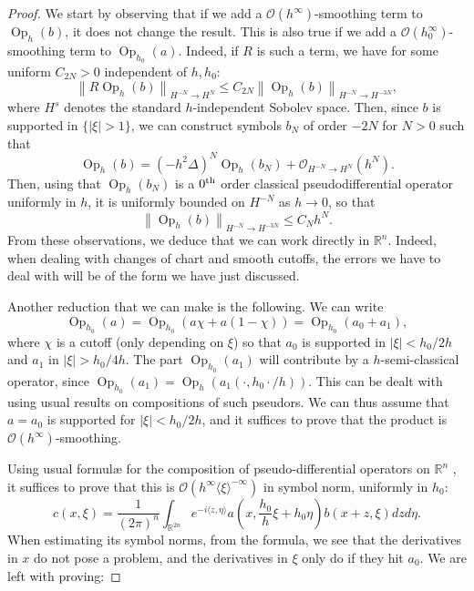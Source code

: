 \documentclass[10pt]{amsart}
\theoremstyle{definition}\newtheorem{defi}[theo]{Definition}\newtheorem{rema}[theo]{Remark}\newtheorem{exam}[theo]{Example}\newtheorem{exem}[theo]{Example}\newtheorem{nota}[theo]{Notation}
\newcommand{\R}{\mathbb{R}}
\newcommand{\mc}{\mathcal}
\newcommand{\clO}{\mathcal{O}}
\DeclareMathOperator{\Op}{Op}
\begin{document}
\begin{proof}
We start by observing that if we add a $\clO(h^\infty)$-smoothing term to $\Op_h(b)$, it does not change the result. This is also true if we add a $\clO(h_0^\infty)$-smoothing term to $\Op_{h_0}(a)$. Indeed, if $R$ is such a term, we have for some uniform $C_{2N} > 0$ independent of $h,h_0$:
\[
\left\| R \Op_h(b)\right\|_{H^{-N}\to H^N} \leq C_{2N} \left\| \Op_h(b)\right\|_{H^{-N}\to H^{-3N}},
\]
where $H^s$ denotes the standard $h$-independent Sobolev space. Then, since $b$ is supported in $\{ |\xi|> 1 \}$, we can construct symbols $b_N$ of order $-2N$ for $N>0$ such that
\[
\Op_h(b) = \left(-h^2\Delta\right)^N\Op_h(b_N) + \clO_{H^{-N}\to H^N}\left(h^N\right).
\]
Then, using that $\Op_h(b_N)$ is a $0^{\rm th}$ order classical pseudodifferential operator uniformly in $h$, it is uniformly bounded on $H^{-N}$ as $h\to 0$, so that
\[
\left\| \Op_h(b)\right\|_{H^{-N}\to H^{-3N}} \leq C_N h^N.
\]
From these observations, we deduce that we can work directly in $\R^n$. Indeed, when dealing with changes of chart and smooth cutoffs, the errors we have to deal with will be of the form we have just discussed.

Another reduction that we can make is the following. We can write
\[
\Op_{h_0}(a) = \Op_{h_0}(a \chi + a(1-\chi)) = \Op_{h_0}(a_0+a_1),
\]
where $\chi$ is a cutoff (only depending on $\xi$) so that $a_0$ is supported in $|\xi| < h_0/2h$ and $a_1$ in $|\xi| > h_0/4h$. The part $\Op_{h_0}(a_1)$ will contribute by a $h$-semi-classical operator, since $\Op_{h_0}(a_1) = \Op_h (a_1(\cdot, h_0\cdot /h))$. This can be dealt with using usual results on compositions of such pseudors. We can thus assume that $a=a_0$ is supported for $|\xi|< h_0 /2h$, and it suffices to prove that the product is $\mc{O}(h^\infty)$-smoothing.

Using usual formulæ for the composition of pseudo-differential operators on $\R^n$ \cite[Theorem~4.14]{Zworski-12}, it suffices to prove that this is $\clO(h^\infty \langle\xi\rangle^{-\infty})$ in symbol norm, uniformly in $h_0$:
\[
c (x, \xi) = \frac{1}{(2\pi)^n}\int_{\R^{2n}} e^{-i \langle z, \eta \rangle } a\left(x, \frac{h_0}{h}\xi + h_0\eta\right) b(x+z, \xi) dz d\eta.
\]
When estimating its symbol norms, from the formula, we see that the derivatives in $x$ do not pose a problem, and the derivatives in $\xi$ only do if they hit $a_0$. We are left with proving:


\end{proof}
\end{document}
